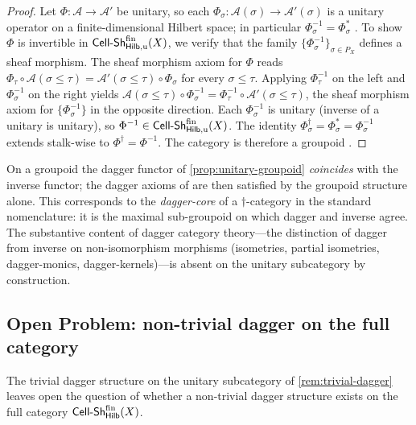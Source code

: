 \begin{proof}
Let $\Phi : \mathscr{A} \to \mathscr{A}'$ be unitary, so each
$\Phi_\sigma : \mathscr{A}(\sigma) \to \mathscr{A}'(\sigma)$ is a
unitary operator on a finite-dimensional Hilbert space; in particular
$\Phi_\sigma^{-1} = \Phi_\sigma^*$ \cite[\S VI.1]{ReedSimonI}. To
show $\Phi$ is invertible in $\mathsf{Cell\text{-}Sh}^{\mathrm{fin}}_{\mathsf{Hilb},\mathrm{u}}(X)$,
we verify that the family
$\{\Phi_\sigma^{-1}\}_{\sigma \in P_X}$ defines a sheaf morphism.
The sheaf morphism axiom for $\Phi$ reads
$\Phi_\tau \circ \mathscr{A}(\sigma \le \tau) =
\mathscr{A}'(\sigma \le \tau) \circ \Phi_\sigma$ for every
$\sigma \le \tau$. Applying $\Phi_\tau^{-1}$ on the left and
$\Phi_\sigma^{-1}$ on the right yields
$\mathscr{A}(\sigma \le \tau) \circ \Phi_\sigma^{-1} =
\Phi_\tau^{-1} \circ \mathscr{A}'(\sigma \le \tau)$, the sheaf
morphism axiom for $\{\Phi_\sigma^{-1}\}$ in the opposite direction.
Each $\Phi_\sigma^{-1}$ is unitary (inverse of a unitary is
unitary), so $\Phi^{-1} \in \mathsf{Cell\text{-}Sh}^{\mathrm{fin}}_{\mathsf{Hilb},\mathrm{u}}(X)$.
The identity $\Phi^\dagger_\sigma = \Phi_\sigma^* = \Phi_\sigma^{-1}$
extends stalk-wise to $\Phi^\dagger = \Phi^{-1}$. The category is
therefore a groupoid \cite[\S I.5]{MacLane1971}.
\end{proof}

\begin{remark}\label{rem:trivial-dagger}
On a groupoid the dagger functor of \cref{prop:unitary-groupoid}
\emph{coincides} with the inverse functor; the dagger axioms of
\cite[\S 2.3]{HeunenVicary2019} are then satisfied by the
groupoid structure alone. This corresponds to the
\emph{dagger-core} of a $\dagger$-category in the standard
nomenclature: it is the maximal sub-groupoid on which dagger and
inverse agree. The substantive content of dagger category
theory---the distinction of dagger from inverse on non-isomorphism
morphisms (isometries, partial isometries, dagger-monics,
dagger-kernels)---is absent on the unitary subcategory by
construction.
\end{remark}

\subsection{Open Problem: non-trivial dagger on the full category}\label{subsec:sheafbw-op}

The trivial dagger structure on the unitary subcategory of
\cref{rem:trivial-dagger} leaves open the question of whether a
non-trivial dagger structure exists on the full category
$\mathsf{Cell\text{-}Sh}^{\mathrm{fin}}_{\mathsf{Hilb}}(X)$.


